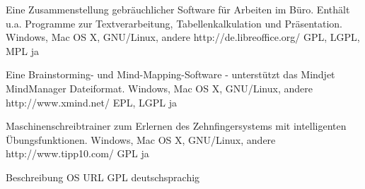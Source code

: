 \documentclass[11pt,a4paper,landscape,twocolumn]{article}
\begin{document}


{Eine Zusammenstellung gebräuchlicher Software für Arbeiten im Büro. Enthält u.a. Programme zur Textverarbeitung, Tabellenkalkulation und Präsentation.}
{Windows, Mac OS X, GNU/Linux, andere}
{http://de.libreoffice.org/}
{GPL, LGPL, MPL}
{ja}

{Eine Brainstorming- und Mind-Mapping-Software - unterstützt das Mindjet MindManager Dateiformat.}
{Windows, Mac OS X, GNU/Linux, andere}
{http://www.xmind.net/}
{EPL, LGPL}
{ja}

{Maschinenschreibtrainer zum Erlernen des Zehnfingersystems mit intelligenten Übungsfunktionen.}
{Windows, Mac OS X, GNU/Linux, andere}
{http://www.tipp10.com/}
{GPL}
{ja}


\newpage %


{Beschreibung}
{OS}
{URL}
{GPL}
{deutschsprachig}
\end{document}
